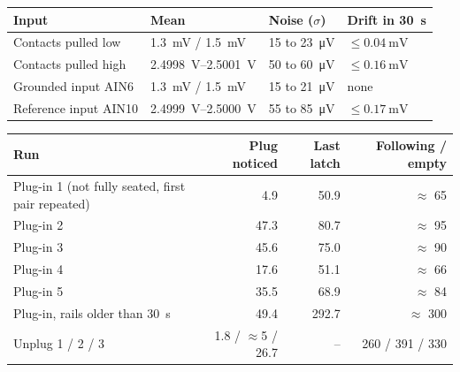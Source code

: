 \begin{table}[htbp]
  \centering
  \footnotesize
  \label{tab:adc-noise}
  \begin{tabular}{@{}llll@{}}
    \toprule
    \textbf{Input} & \textbf{Mean} & \textbf{Noise ($\sigma$)} & \textbf{Drift in \qty{30}{\second}} \\
    \midrule
    Contacts pulled low & \qty{+1.3}{\milli\volt} / \qty{+1.5}{\milli\volt} & 15 to \qty{23}{\micro\volt} & $\leq \qty{0.04}{\milli\volt}$ \\
    Contacts pulled high & \qtyrange{2.4998}{2.5001}{\volt} & 50 to \qty{60}{\micro\volt} & $\leq \qty{0.16}{\milli\volt}$ \\
    Grounded input AIN6 & \qty{+1.3}{\milli\volt} / \qty{+1.5}{\milli\volt} & 15 to \qty{21}{\micro\volt} & none \\
    Reference input AIN10 & \qtyrange{2.4999}{2.5000}{\volt} & 55 to \qty{85}{\micro\volt} & $\leq \qty{0.17}{\milli\volt}$ \\
    \bottomrule
  \end{tabular}
\end{table}

\begin{table}[htbp]
  \centering
  \footnotesize
  \label{tab:plug-in}
  \begin{tabular}{@{}lrrr@{}}
    \toprule
    \textbf{Run} & \textbf{Plug noticed} & \textbf{Last latch} & \textbf{Following / empty} \\
    \midrule
    Plug-in 1 (not fully seated, first pair repeated) & 4.9 & 50.9 & $\approx$ 65 \\
    Plug-in 2 & 47.3 & 80.7 & $\approx$ 95 \\
    Plug-in 3 & 45.6 & 75.0 & $\approx$ 90 \\
    Plug-in 4 & 17.6 & 51.1 & $\approx$ 66 \\
    Plug-in 5 & 35.5 & 68.9 & $\approx$ 84 \\
    Plug-in, rails older than \qty{30}{\second} & 49.4 & 292.7 & $\approx$ 300 \\
    Unplug 1 / 2 / 3 & 1.8 / $\approx$5 / 26.7 & -- & 260 / 391 / 330 \\
    \bottomrule
  \end{tabular}
\end{table}

